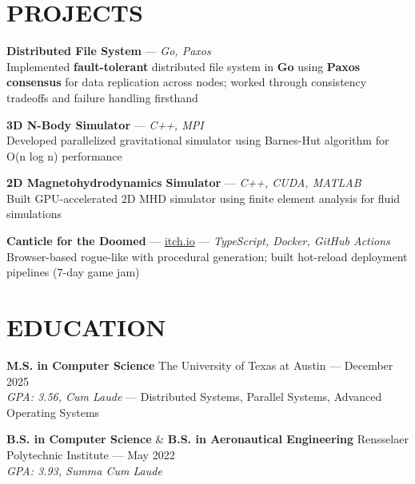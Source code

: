 \documentclass{article}
\begin{document}
\section*{PROJECTS}
\textbf{Distributed File System} — \textit{Go, Paxos} \\
Implemented \textbf{fault-tolerant} distributed file system in \textbf{Go} using \textbf{Paxos consensus} for data replication across nodes; worked through consistency tradeoffs and failure handling firsthand

\textbf{3D N-Body Simulator} — \textit{C++, MPI} \\
Developed parallelized gravitational simulator using Barnes-Hut algorithm for O(n log n) performance

\textbf{2D Magnetohydrodynamics Simulator} — \textit{C++, CUDA, MATLAB} \\
Built GPU-accelerated 2D MHD simulator using finite element analysis for fluid simulations

\textbf{Canticle for the Doomed} — \href{https://sve009.itch.io/canticle-for-the-doomed}{itch.io} — \textit{TypeScript, Docker, GitHub Actions} \\
Browser-based rogue-like with procedural generation; built hot-reload deployment pipelines (7-day game jam)

\section*{EDUCATION}
\textbf{M.S. in Computer Science} \hfill The University of Texas at Austin — December 2025 \\
\textit{GPA: 3.56, Cum Laude} — Distributed Systems, Parallel Systems, Advanced Operating Systems

\textbf{B.S. in Computer Science} \& \textbf{B.S. in Aeronautical Engineering} \hfill Rensselaer Polytechnic Institute — May 2022 \\
\textit{GPA: 3.93, Summa Cum Laude}
\end{document}
